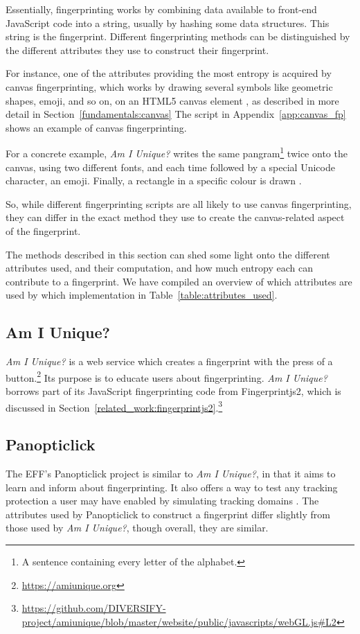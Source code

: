 \documentclass[
    fontsize=12pt,
    headings=small,
    parskip=half,
    bibliography=totoc,
    numbers=noenddot,
    open=any
    ]{scrreprt}
\begin{document}
Essentially, fingerprinting works by combining data available to front-end JavaScript code into a string,
usually by hashing some data structures. This string is the fingerprint.
Different fingerprinting methods can be distinguished by the different attributes they use to construct their fingerprint.

For instance, one of the attributes providing the most entropy is acquired by canvas fingerprinting, which works by drawing
several symbols like geometric shapes, emoji, and so on, on an HTML5 canvas element \cite{laperdrix2016beauty},
as described in more detail in Section~\ref{fundamentals:canvas}
The script in Appendix~\ref{app:canvas_fp} shows an example of canvas fingerprinting.

For a concrete example, \textit{Am I Unique?} writes the same pangram\footnote{A sentence containing every letter of the alphabet.}
twice onto the canvas, using two different fonts, and each time followed by a special Unicode character, an emoji.
Finally, a rectangle in a specific colour is drawn \cite{laperdrix2016beauty}.

So, while different fingerprinting scripts are all likely to use canvas fingerprinting, they can differ in the exact
method they use to create the canvas-related aspect of the fingerprint.

The methods described in this section can shed some light onto the different attributes used, and their computation,
and how much entropy each can contribute to a fingerprint.
We have compiled an overview of which attributes are used by which implementation in Table~\ref{table:attributes_used}.


\subsection{Am I Unique?}
\label{related_work:am_i_unique}
\textit{Am I Unique?} \cite{laperdrix2016beauty} is a web service which creates
a fingerprint with the press of a button.\footnote{\url{https://amiunique.org}}
Its purpose is to educate users about fingerprinting.
\textit{Am I Unique?} borrows part of its JavaScript fingerprinting code from
Fingerprintjs2, which is discussed in Section~\ref{related_work:fingerprintjs2}.\footnote{\url{https://github.com/DIVERSIFY-project/amiunique/blob/master/website/public/javascripts/webGL.js\#L2}}


\subsection{Panopticlick}
\label{related_work:panopticlick}
The EFF's Panopticlick project is similar to \textit{Am I Unique?}, in that it aims to learn and inform about
fingerprinting. It also offers a way to test any tracking protection a user may have enabled by simulating
tracking domains \cite{panopticlick}. The attributes used by Panopticlick to construct a fingerprint differ slightly from those used by
\textit{Am I Unique?}, though overall, they are similar.
\end{document}
